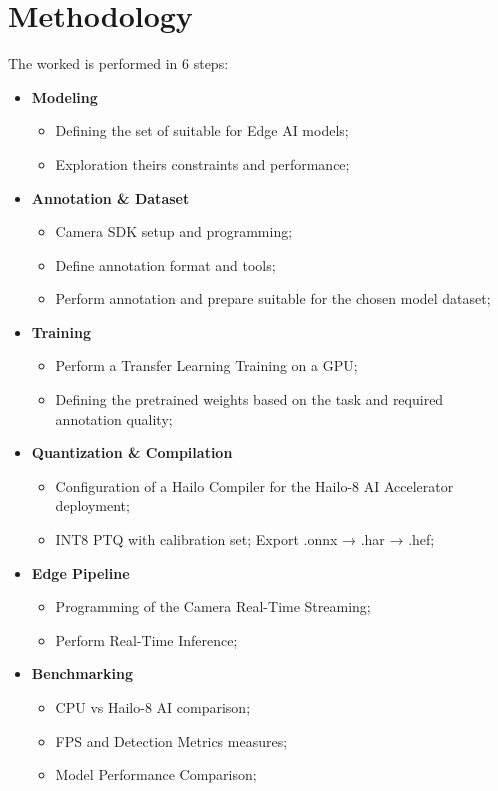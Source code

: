 \documentclass[12pt,a4paper]{report}
\begin{document}
\chapter{Methodology}
\noindent

The worked is performed in 6 steps:

    \begin{itemize}
        \item \textbf{Modeling}
            \begin{itemize}
                \item Defining the set of suitable for Edge AI models;
                \item Exploration theirs constraints and performance;
            \end{itemize}
        \item \textbf{Annotation \& Dataset}
            \begin{itemize}
                \item Camera SDK setup and programming;
                \item Define annotation format and tools;
                \item Perform annotation and prepare suitable for the chosen model
                    dataset;
             \end{itemize}
        \item \textbf{Training}
            \begin{itemize}
                \item Perform a Transfer Learning Training on a GPU;
                \item Defining the pretrained weights based on the task
                        and required annotation quality;
            \end{itemize}
        \item \textbf{Quantization \& Compilation}
            \begin{itemize}
                \item Configuration of a Hailo Compiler for the Hailo-8 AI
                    Accelerator deployment;
                \item INT8 PTQ with calibration set; Export .onnx → .har → .hef;
            \end{itemize}
        \item \textbf{Edge Pipeline}
            \begin{itemize}
                    \item Programming of the Camera Real-Time Streaming;
                    \item Perform Real-Time Inference;
            \end{itemize}
        \item \textbf{Benchmarking}
            \begin{itemize}
                \item CPU vs Hailo-8 AI comparison;
                \item FPS and Detection Metrics measures;
                \item Model Performance Comparison;
            \end{itemize}
    \end{itemize}
\end{document}
